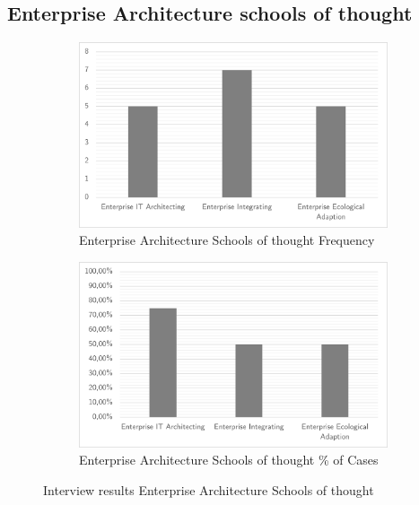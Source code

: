 \subsection{Enterprise Architecture schools of thought}
\begin{figure}[H]
	\centering
	\begin{subfigure}[H]{0.5\textwidth}
		\centering
		\includegraphics[width=0.95\linewidth]{images/easchools_frequency}
		\caption{Enterprise Architecture Schools of thought Frequency}
		\label{fig:easchoolsfrequency}
	\end{subfigure}%
	\begin{subfigure}[H]{0.5\textwidth}
		\centering
		\includegraphics[width=0.95\linewidth]{images/easchools_cases}
		\caption{Enterprise Architecture Schools of thought \% of Cases}
		\label{fig:easchoolscases}
	\end{subfigure}
	\caption{Interview results Enterprise Architecture Schools of thought}
	\label{fig:easchoolsantifragile}
\end{figure}


